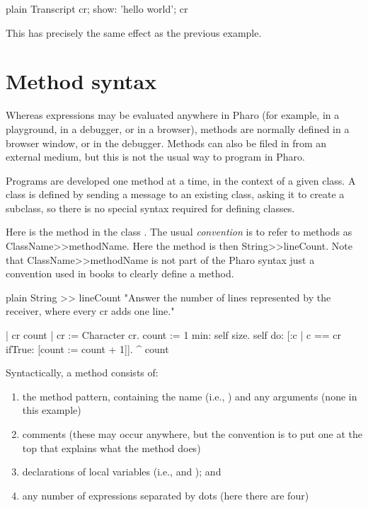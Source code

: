 \documentclass[10pt,twoside,english]{_support/latex/sbabook/sbabook}
\begin{document}
\begin{displaycode}{plain}
Transcript
  cr;
  show: 'hello world';
  cr
\end{displaycode}

This has precisely the same effect as the previous example.
\section{Method syntax}
Whereas expressions may be evaluated anywhere in Pharo (for example, in a
playground, in a debugger, or in a browser), methods are normally defined in a
browser window, or in the debugger. Methods can also be filed in from an
external medium, but this is not the usual way to program in Pharo.

Programs are developed one method at a time, in the context of a given class. A
class is defined by sending a message to an existing class, asking it to create
a subclass, so there is no special syntax required for defining classes.

Here is the method  in the class . The usual \textit{convention}
is to refer to methods as ClassName\textgreater{}\textgreater{}methodName. Here the method is then  String\textgreater{}\textgreater{}lineCount.
Note that  ClassName\textgreater{}\textgreater{}methodName is not part of the Pharo syntax just
a convention used in books to clearly define a method.

\begin{displaycode}{plain}
String >> lineCount
	"Answer the number of lines represented by the receiver, where every cr adds one line."

	| cr count |
	cr := Character cr.
	count := 1 min: self size.
	self do: [:c | c == cr ifTrue: [count := count + 1]].
	^ count
\end{displaycode}

Syntactically, a method consists of:

\begin{enumerate}
\item the method pattern, containing the name (i.e., ) and any arguments (none in this example)
\item comments (these may occur anywhere, but the convention is to put one at the top that explains what the method does)
\item declarations of local variables (i.e.,  and ); and
\item any number of expressions separated by dots (here there are four)
\end{enumerate}
\end{document}
